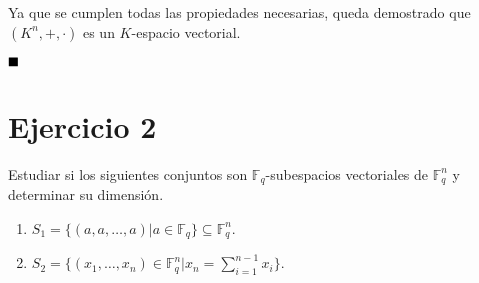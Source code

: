 Ya que se cumplen todas las propiedades necesarias, queda demostrado que $(K^n, +, \cdot)$ es un $K$-espacio vectorial.

$\qed$

\section{Ejercicio 2}

\begin{formulationBox}
	Estudiar si los siguientes conjuntos son $\mathbb{F}_q$-subespacios vectoriales de $\mathbb{F}_q^n$ y determinar su dimensión.
	\begin{enumerate}[label=\alph*)]
		\item $S_1=\{(a,a,\dots,a)|a\in\mathbb{F}_q\}\subseteq\mathbb{F}_q^n$.
		\item $S_2=\{(x_1,\dots,x_n)\in\mathbb{F}_q^n|x_n=\sum_{i=1}^{n-1}x_i\}$.
	\end{enumerate}
\end{formulationBox}

